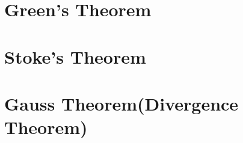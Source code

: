 \documentclass[12pt,a4paper]{article}
\begin{document}
\begin{itemize}
	\end{itemize}
	
	\newpage
	
	\section{Green's Theorem}
	
	\newpage
	
	\section{Stoke's Theorem}
	
	\newpage
	
	\section{Gauss Theorem(Divergence Theorem)}
	
	
	

	
	
	

	
\end{document}
